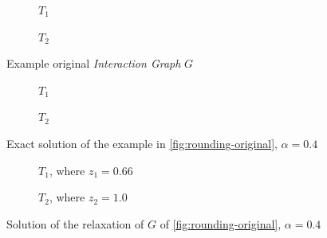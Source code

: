 \begin{figure}
	\begin{center}
		\begin{subfigure}[b]{0.4\textwidth}
			\centering
			\caption{$T_1$}
			\label{fig:rounding-original-t1}
		\end{subfigure}
		\begin{subfigure}[b]{0.4\textwidth}
			\centering
			\caption{$T_2$}
			\label{fig:rounding-original-t2}
		\end{subfigure}
	\end{center}
	\caption{Example original \emph{Interaction Graph} $G$}
	\label{fig:rounding-original}
\end{figure}
\begin{figure}
	\begin{center}
		\begin{subfigure}[b]{0.4\textwidth}
			\centering
			\caption{$T_1$}
			\label{fig:rounding-integer-t1}
		\end{subfigure}
		\begin{subfigure}[b]{0.4\textwidth}
			\centering
			\caption{$T_2$}
			\label{fig:rounding-original-t2}
		\end{subfigure}
	\end{center}
	\caption{Exact solution of the example in \autoref{fig:rounding-original},
		$\alpha = 0.4$}
	\label{fig:rounding-integer}
\end{figure}
\begin{figure}
	\begin{center}
		\begin{subfigure}[b]{0.4\textwidth}
			\centering
			\caption{$T_1$, where $z_1 = 0.66$}
			\label{fig:rounding-relaxed-t1}
		\end{subfigure}
		\begin{subfigure}[b]{0.4\textwidth}
			\centering
			\caption{$T_2$, where $z_2 = 1.0$}
			\label{fig:rounding-relaxed-t2}
		\end{subfigure}
	\end{center}
	\caption{Solution of the relaxation of $G$ of
		\autoref{fig:rounding-original}, $\alpha = 0.4$}
	\label{fig:rounding-relaxed}
\end{figure}


